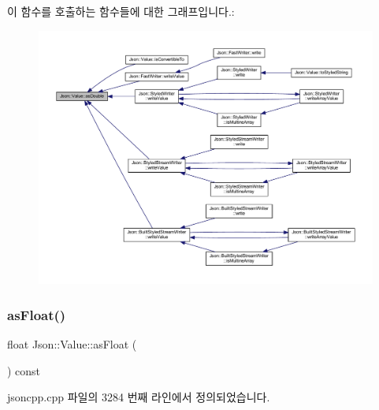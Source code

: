 이 함수를 호출하는 함수들에 대한 그래프입니다.\+:\nopagebreak
\begin{figure}[H]
\begin{center}
\leavevmode
\includegraphics[width=350pt]{class_json_1_1_value_afd24002a18aef907ad746b1cb9eda0a2_icgraph}
\end{center}
\end{figure}
\mbox{\label{class_json_1_1_value_af3a4d10bf575fabdc5440a7135c9649c}} 
\subsubsection{\texorpdfstring{as\+Float()}{asFloat()}}
{\footnotesize\ttfamily float Json\+::\+Value\+::as\+Float (\begin{DoxyParamCaption}{ }\end{DoxyParamCaption}) const}



jsoncpp.\+cpp 파일의 3284 번째 라인에서 정의되었습니다.


